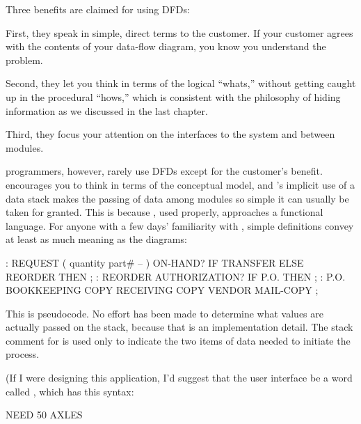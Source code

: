 Three benefits are claimed for using DFDs:

First, they speak in simple, direct terms to the customer. If your
customer agrees with the contents of your data-flow diagram, you know
you understand the problem.

Second, they let you think in terms of the logical ``whats,'' without
getting caught up in the procedural ``hows,'' which is consistent with
the philosophy of hiding information as we discussed in the last chapter.

Third, they focus your attention on the interfaces to the system and
between modules.

\Forth{} programmers, however, rarely use DFDs except for the customer's
benefit. \Forth{} encourages you to think in terms of the conceptual
model, and \Forth{}'s implicit use of a data stack makes the passing of
data among modules so simple it can usually be taken for granted.
This is because \Forth{}, used properly, approaches a functional language.%
%
%
For anyone with a few days' familiarity with \Forth{}, simple definitions
convey at least as much meaning as the diagrams:
\begin{Code}
: REQUEST  ( quantity part# -- )
   ON-HAND?  IF  TRANSFER  ELSE  REORDER  THEN ;
: REORDER   AUTHORIZATION?  IF  P.O.  THEN ;
: P.O.   BOOKKEEPING COPY   RECEIVING COPY
   VENDOR MAIL-COPY ;
\end{Code}
This is \Forth{} pseudocode. No effort has been made to determine what
values are actually passed on the stack, because that is an
implementation detail. The stack comment for  is used
only to indicate the two items of data needed to initiate the process.

(If I were designing this application, I'd suggest that the user
interface be a word called , which has this syntax:

\begin{Code}
NEED 50 AXLES
\end{Code}

